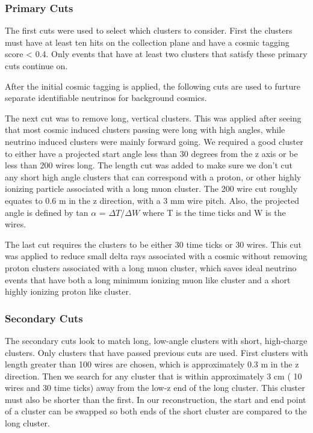 \subsubsection{Primary Cuts}
The first cuts were used to select which clusters to consider. First the clusters must have at least ten hits on the collection plane and have a cosmic tagging score < 0.4. Only events that have at least two clusters that satisfy these primary cuts continue on.

After the initial cosmic tagging is applied, the following cuts are used to furture separate identifiable neutrinos for background cosmics. 

The next cut was to remove long, vertical clusters. This was applied after seeing that most cosmic induced clusters passing were long with high angles, while neutrino induced clusters were mainly forward going. We required a good cluster to either have a projected start angle less than 30 degrees from the z axis or be less than 200 wires long. The length cut was added to make sure we don't cut any short high angle clusters that can correspond with a proton, or other highly ionizing particle associated with a long muon cluster. The 200 wire cut roughly equates to 0.6 m in the z direction, with a 3 mm wire pitch. Also, the projected angle is defined by tan $\alpha$ = $\Delta T / \Delta W$ where T is the time ticks and W is the wires. 

The last cut requires the clusters to be either 30 time ticks or 30 wires. This cut was applied to reduce small delta rays associated with a cosmic without removing proton clusters associated with a long muon cluster, which saves ideal neutrino events that have both a long minimum ionizing muon like cluster and a short highly ionizing proton like cluster.

\subsubsection{Secondary Cuts}
The secondary cuts look to match long, low-angle clusters with short, high-charge clusters. Only clusters that have passed previous cuts are used. First clusters with length greater than 100 wires are chosen, which is approximately 0.3 m in the z direction. Then we search for any cluster that is within approximately 3 cm ( 10 wires and 30 time ticks) away from the low-z end of the long cluster. This cluster must also be shorter than the first. In our reconstruction, the start and end point of a cluster can be swapped so both ends of the short cluster are compared to the long cluster. 

